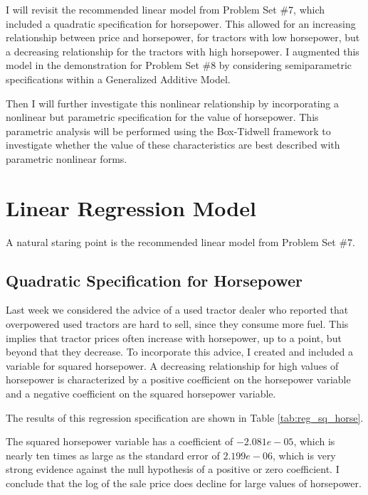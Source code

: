 \documentclass[11pt]{paper}
\begin{document}
I will revisit the recommended linear model
from Problem Set \#7, 
which included a quadratic specification for horsepower.
This allowed for an increasing relationship 
between price and horsepower, 
for tractors with low horsepower, 
but a decreasing relationship for the tractors with high horsepower. 
I augmented this model in the demonstration for 
Problem Set \#8 
by considering semiparametric specifications
within a Generalized Additive Model. 


Then I will further investigate this nonlinear relationship
by incorporating a nonlinear but parametric specification
for the value of horsepower. 
This parametric analysis will be performed
using the Box-Tidwell framework
to investigate whether the value of these characteristics
are best described with parametric nonlinear forms. 

\clearpage
\section{Linear Regression Model}

A natural staring point is the recommended linear model
from Problem Set \#7. 

\subsection{Quadratic Specification for Horsepower}

Last week we considered the advice of
a used tractor dealer who reported that overpowered used tractors are hard to sell, since they consume more fuel. 
This implies that tractor prices often increase with horsepower, up to a point, but beyond that they decrease. 
To incorporate this advice, I created and included a variable for squared horsepower. 
A decreasing relationship for high values of horsepower
is characterized by 
a positive coefficient on the horsepower variable and
a negative coefficient on the squared horsepower variable. 

The results of this regression specification are shown in 
Table \ref{tab:reg_sq_horse}. 
% 

% 
The squared horsepower variable has a coefficient of $-2.081e-05$, which is nearly ten times as large as the standard error of $2.199e-06$, which is very strong evidence against the null hypothesis of a positive or zero coefficient. 
I conclude that the log of the sale price does decline for large values of horsepower. 
\end{document}
